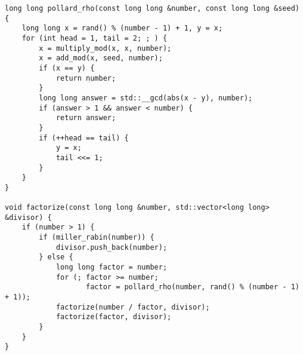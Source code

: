 \begin{lstlisting}
long long pollard_rho(const long long &number, const long long &seed) {
    long long x = rand() % (number - 1) + 1, y = x;
    for (int head = 1, tail = 2; ; ) {
        x = multiply_mod(x, x, number);
        x = add_mod(x, seed, number);
        if (x == y) {
            return number;
        }
        long long answer = std::__gcd(abs(x - y), number);
        if (answer > 1 && answer < number) {
            return answer;
        }
        if (++head == tail) {
            y = x;
            tail <<= 1;
        }
    }
}

void factorize(const long long &number, std::vector<long long> &divisor) {
    if (number > 1) {
        if (miller_rabin(number)) {
            divisor.push_back(number);
        } else {
            long long factor = number;
            for (; factor >= number;
                   factor = pollard_rho(number, rand() % (number - 1) + 1));
            factorize(number / factor, divisor);
            factorize(factor, divisor);
        }
    }
}
\end{lstlisting}
